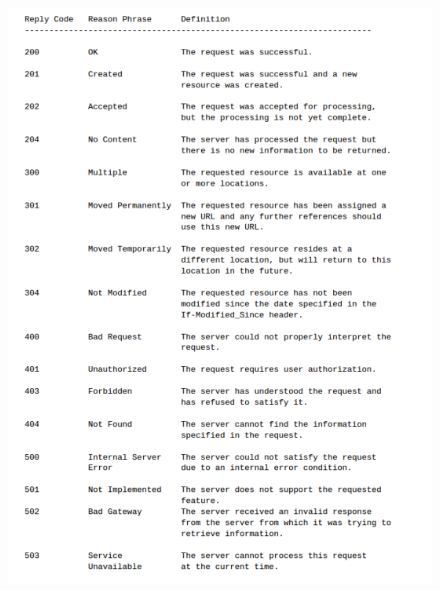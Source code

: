 \documentclass[4paper]{article}
\begin{document}
\begin{figure}[H]
\includegraphics[scale=1]{../imagenes/codigos.png}
\end{figure}
\newpage
\end{document}

